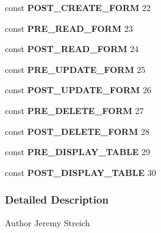 \begin{DoxyCompactItemize}
\item 
\hypertarget{database__form_8inc_8php_af68fcad1156498dd5b3588b76bd23f68}{const {\bfseries P\-O\-S\-T\-\_\-\-C\-R\-E\-A\-T\-E\-\_\-\-F\-O\-R\-M} 22}\label{database__form_8inc_8php_af68fcad1156498dd5b3588b76bd23f68}

\item 
\hypertarget{database__form_8inc_8php_a9f93a6e894ead7602ca283f71fb7a4d7}{const {\bfseries P\-R\-E\-\_\-\-R\-E\-A\-D\-\_\-\-F\-O\-R\-M} 23}\label{database__form_8inc_8php_a9f93a6e894ead7602ca283f71fb7a4d7}

\item 
\hypertarget{database__form_8inc_8php_a938610bf3e34260d5d5d76aa775c3958}{const {\bfseries P\-O\-S\-T\-\_\-\-R\-E\-A\-D\-\_\-\-F\-O\-R\-M} 24}\label{database__form_8inc_8php_a938610bf3e34260d5d5d76aa775c3958}

\item 
\hypertarget{database__form_8inc_8php_a7b0fa06d08213e61b98b5fc0e0315039}{const {\bfseries P\-R\-E\-\_\-\-U\-P\-D\-A\-T\-E\-\_\-\-F\-O\-R\-M} 25}\label{database__form_8inc_8php_a7b0fa06d08213e61b98b5fc0e0315039}

\item 
\hypertarget{database__form_8inc_8php_a9e5f5f4c61f5e12d17802144d7973a0f}{const {\bfseries P\-O\-S\-T\-\_\-\-U\-P\-D\-A\-T\-E\-\_\-\-F\-O\-R\-M} 26}\label{database__form_8inc_8php_a9e5f5f4c61f5e12d17802144d7973a0f}

\item 
\hypertarget{database__form_8inc_8php_a1a0f38e54884458725092f81044b0703}{const {\bfseries P\-R\-E\-\_\-\-D\-E\-L\-E\-T\-E\-\_\-\-F\-O\-R\-M} 27}\label{database__form_8inc_8php_a1a0f38e54884458725092f81044b0703}

\item 
\hypertarget{database__form_8inc_8php_ae5f87bb485fffe4d9aed4ca7be1cbb2e}{const {\bfseries P\-O\-S\-T\-\_\-\-D\-E\-L\-E\-T\-E\-\_\-\-F\-O\-R\-M} 28}\label{database__form_8inc_8php_ae5f87bb485fffe4d9aed4ca7be1cbb2e}

\item 
\hypertarget{database__form_8inc_8php_a9fc01943ae707ad2c9bd1148db40c1b8}{const {\bfseries P\-R\-E\-\_\-\-D\-I\-S\-P\-L\-A\-Y\-\_\-\-T\-A\-B\-L\-E} 29}\label{database__form_8inc_8php_a9fc01943ae707ad2c9bd1148db40c1b8}

\item 
\hypertarget{database__form_8inc_8php_a78fca788f45dd6dce809fda74b9ba1b7}{const {\bfseries P\-O\-S\-T\-\_\-\-D\-I\-S\-P\-L\-A\-Y\-\_\-\-T\-A\-B\-L\-E} 30}\label{database__form_8inc_8php_a78fca788f45dd6dce809fda74b9ba1b7}

\end{DoxyCompactItemize}


\subsubsection{Detailed Description}
\begin{DoxyAuthor}{Author}
Jeremy Streich 
\end{DoxyAuthor}
